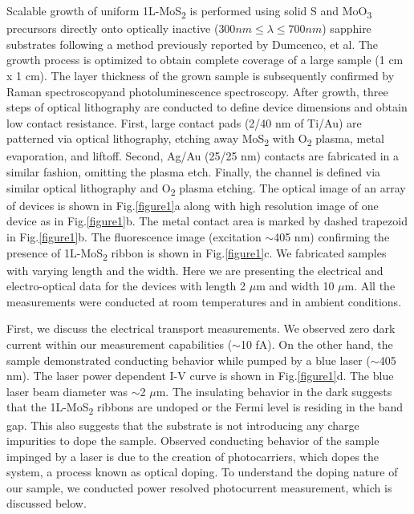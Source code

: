 \documentclass[%
 reprint,%
 amssymb, amsmath,%
 aip,cha,%
]{revtex4-1}
\begin{document}
Scalable growth of uniform 1L-MoS\textsubscript{2} is performed using solid S and MoO\textsubscript{3} precursors directly onto optically inactive ($300 nm \leqslant \lambda \leqslant 700 nm$) sapphire substrates following a method previously reported by Dumcenco, et al.\cite{22} The growth process is optimized to obtain complete coverage of a large sample (1 cm x 1 cm). The layer thickness of the grown sample is subsequently confirmed by Raman spectroscopy\cite{23, 24, 25}and photoluminescence spectroscopy.\cite{26} After growth, three steps of optical lithography are conducted to define device dimensions and obtain low contact resistance. First, large contact pads (2/40 nm of Ti/Au) are patterned via optical lithography, etching away MoS\textsubscript{2} with O\textsubscript{2} plasma, metal evaporation, and liftoff. Second, Ag/Au (25/25 nm) contacts are fabricated in a similar fashion, omitting the plasma etch. Finally, the channel is defined via similar optical lithography and O\textsubscript{2} plasma etching. The optical image of an array of devices is shown in Fig.\ref{figure1}a along with high resolution image of one device as in Fig.\ref{figure1}b. The metal contact area is marked by dashed trapezoid in Fig.\ref{figure1}b. The fluorescence image (excitation $\sim$405 nm) confirming the presence of 1L-MoS\textsubscript{2} ribbon is shown in Fig.\ref{figure1}c. We fabricated samples with varying length and the width. Here we are presenting the electrical and electro-optical data for the devices with length 2 $\mu$m and width 10 $\mu$m. All the measurements were conducted at room temperatures and in ambient conditions.

First, we discuss the electrical transport measurements. We observed zero dark current within our measurement capabilities ($\sim$10 fA). On the other hand, the sample demonstrated conducting behavior while pumped by a blue laser ($\sim$405 nm). The laser power dependent I-V curve is shown in Fig.\ref{figure1}d. The blue laser beam diameter was $\sim$2 $\mu$m. The insulating behavior in the dark suggests that the 1L-MoS\textsubscript{2} ribbons are undoped or the Fermi level is residing in the band gap.\cite{27} This also suggests that the substrate is not introducing any charge impurities to dope the sample.\cite{27} Observed conducting behavior of the sample impinged by a laser is due to the creation of photocarriers, which dopes the system, a process known as optical doping.\cite{28} To understand the doping nature of our sample, we conducted power resolved photocurrent measurement, which is discussed below.
\end{document}
